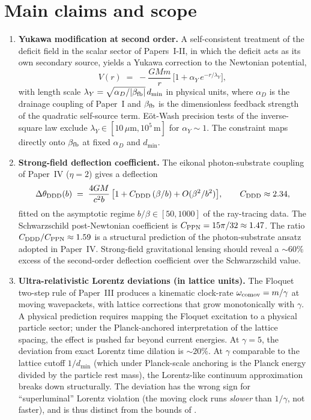 \documentclass[11pt,a4paper]{article}
\begin{document}
\section{Main claims and scope}
\label{sec:claims}

\begin{enumerate}
\item \textbf{Yukawa modification at second order.}
A self-consistent treatment of the deficit field in the scalar sector
of Papers~I-II, in which the deficit acts as its own secondary source,
yields a Yukawa correction to the Newtonian potential,
\[
V(r) \;=\; -\frac{G M m}{r}\,\big[1 + \alpha_Y\, e^{-r/\lambda_Y}\big],
\]
with length scale $\lambda_Y = \sqrt{\alpha_D / |\beta_{\rm fb}|}\, d_{\min}$
in physical units, where $\alpha_D$ is the drainage coupling of Paper~I
and $\beta_{\rm fb}$ is the dimensionless feedback strength of the
quadratic self-source term. E\"{o}t-Wash precision tests of the
inverse-square law \cite{adelberger2003,kapner2007} exclude
$\lambda_Y \in [10\,\mu\text{m}, 10^5\,\text{m}]$ for $\alpha_Y \sim 1$.
The constraint maps directly onto $\beta_{\rm fb}$ at fixed
$\alpha_D$ and $d_{\min}$.

\item \textbf{Strong-field deflection coefficient.}
The eikonal photon-substrate coupling of Paper~IV ($\eta = 2$) gives a
deflection
\[
\Delta\theta_{\rm DDD}(b) \;=\; \frac{4GM}{c^2 b}
\,\big[1 + C_{\rm DDD}\,(\beta/b) + O(\beta^2/b^2)\big],
\qquad C_{\rm DDD} \approx 2.34,
\]
fitted on the asymptotic regime $b/\beta \in [50, 1000]$ of the
ray-tracing data. The Schwarzschild post-Newtonian coefficient is
$C_{\rm PPN} = 15\pi/32 \approx 1.47$. The ratio
$C_{\rm DDD}/C_{\rm PPN} \approx 1.59$ is a structural prediction of
the photon-substrate ansatz adopted in Paper~IV. Strong-field
gravitational lensing should reveal a $\sim 60\%$ excess of the
second-order deflection coefficient over the Schwarzschild value.

\item \textbf{Ultra-relativistic Lorentz deviations (in lattice units).}
The Floquet two-step rule of Paper~III produces a kinematic clock-rate
$\omega_{\rm comov} = m/\gamma$ at moving wavepackets, with
lattice corrections that grow monotonically with $\gamma$.
A physical prediction requires mapping the Floquet excitation to a
physical particle sector; under the Planck-anchored interpretation of
the lattice spacing, the effect is pushed far beyond current energies. At
$\gamma = 5$, the deviation from exact Lorentz time dilation is
$\sim 20\%$. At $\gamma$ comparable to the lattice cutoff $1/d_{\min}$
(which under Planck-scale anchoring is the Planck energy divided by the
particle rest mass), the Lorentz-like continuum approximation breaks down structurally. The deviation has the wrong sign for ``superluminal'' Lorentz violation
(the moving clock runs \emph{slower} than $1/\gamma$, not faster), and
is thus distinct from the bounds of \cite{stecker2014}.


\end{enumerate}
\end{document}
